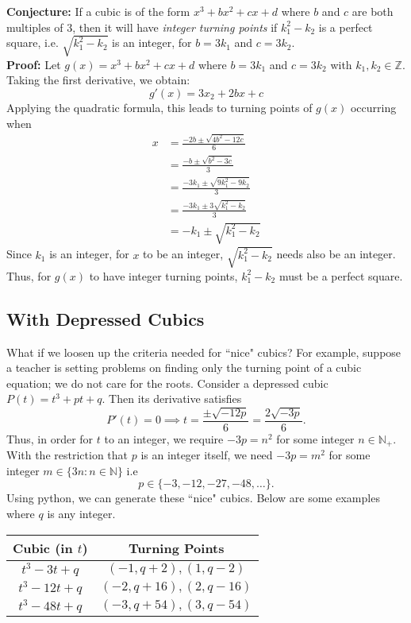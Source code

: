 \documentclass[12pt]{article}
\newcommand{\N}{\mathbb{N}}
\begin{document}
\textbf{Conjecture:} If a cubic is of the form $x^3 + bx^2 + cx + d$ where $b$ and $c$ are both multiples of $3$, then it will have \textit{integer turning points} if $k_1^2 - k_2$ is a perfect square, i.e. $\sqrt{k_1^2 - k_2}$ is an integer, for $b = 3k_1$ and $c = 3k_2$. \\

\textbf{Proof:} Let $g(x) = x^3 + bx^2 + cx + d$ where $b = 3k_1$ and $c = 3k_2$ with $k_1, k_2 \in \mathbb{Z}$. Taking the first derivative, we obtain:
$$g'(x) = 3x_2 + 2bx + c$$
Applying the quadratic formula, this leads to turning points of $g(x)$ occurring when
\begin{align*}
    x &= \frac{-2b \pm \sqrt{4b^2 - 12c}}{6} \\
    &= \frac{-b \pm \sqrt{b^2 - 3c}}{3} \\
    &= \frac{-3k_1 \pm \sqrt{9k_1^2 - 9k_2}}{3} \\
    &= \frac{-3k_1 \pm 3 \sqrt{k_1^2 - k_2}}{3} \\
    &= -k_1 \pm \sqrt{k_1^2 - k_2}
\end{align*}
Since $k_1$ is an integer, for $x$ to be an integer, $\sqrt{k_1^2 - k_2}$ needs also be an integer. Thus, for $g(x)$ to have integer turning points, $k_1^2 - k_2$ must be a perfect square.

\subsection{With Depressed Cubics}
What if we loosen up the criteria needed for ``nice" cubics? For example, suppose a teacher is setting problems on finding only the turning point of a cubic equation; we do not care for the roots. Consider a depressed cubic $P(t) = t^3 + pt + q$. Then its derivative satisfies
\begin{equation*}
    P'(t) = 0 \implies t = \frac{\pm \sqrt{-12p}}{6} = \frac{2\sqrt{-3p}}{6}.
\end{equation*}
Thus, in order for $t$ to an integer, we require $-3p = n^2$ for some integer $n \in \N_+$. With the restriction that $p$ is an integer itself, we need $-3p = m^2$ for some integer $m \in \{3n : n \in \N\}$ i.e
\begin{equation*}
    p \in \{-3, -12, -27, -48, \dots\}.
\end{equation*}
Using python, we can generate these ``nice" cubics. Below are some examples where $q$ is any integer.
\begin{center}
\begin{tabular}{c|c}
Cubic (in $t$) & Turning Points\\
\hline 
$t^3 - 3t + q$ & $(-1, q + 2), (1, q - 2)$\\
$t^3 - 12t + q$ & $(-2, q + 16), (2, q - 16)$\\
$t^3 - 48t + q$ & $(-3, q + 54), (3, q - 54)$
\end{tabular}
\end{center}
\end{document}
